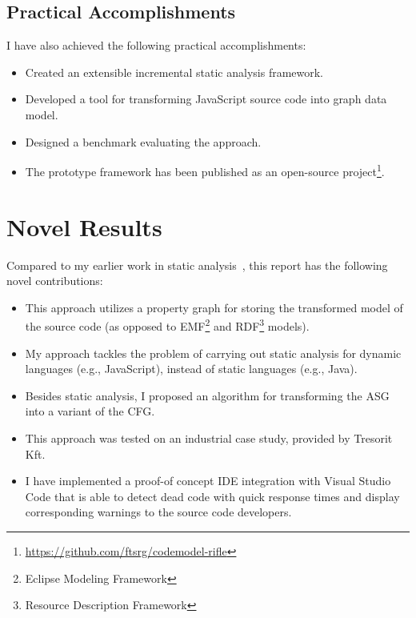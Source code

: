 \subsection{Practical Accomplishments}
I have also achieved the following practical accomplishments:

\begin{itemize}[topsep=0pt]
	\item Created an extensible incremental static analysis framework.
	\item Developed a tool for transforming JavaScript source code into graph data model.
	\item Designed a benchmark evaluating the approach.
	\item The prototype framework has been published as an open-source project\footnote{\small\url{https://github.com/ftsrg/codemodel-rifle}}.
\end{itemize}

\section{Novel Results}
Compared to my earlier work in static analysis~\cite{stein-daniel-tdk,stein-daniel-bsc,stein-daniel-ttc}, this report has the following novel contributions:

\begin{itemize}[topsep=0pt]
	\item This approach utilizes a property graph for storing the transformed model of the source code (as opposed to EMF\footnote{Eclipse Modeling Framework} and RDF\footnote{Resource Description Framework} models).

	\item My approach tackles the problem of carrying out static analysis for dynamic languages (e.g., JavaScript), instead of static languages (e.g., Java).

	\item Besides static analysis, I proposed an algorithm for transforming the ASG into a variant of the CFG.

	\item This approach was tested on an industrial case study, provided by Tresorit Kft.

	\item I have implemented a proof-of concept IDE integration with Visual Studio Code that is able to detect dead code with quick response times and display corresponding warnings to the source code developers.
\end{itemize}
